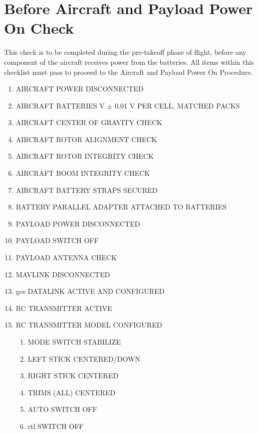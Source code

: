 \documentclass{report}
\begin{document}
	\section{Before Aircraft and Payload Power On Check}
		This check is to be completed during the pre-takeoff phase of flight, before any component of the aircraft receives power from the batteries.  All items within this checklist must pass to proceed to the Aircraft and Payload Power On Procedure.
		\begin{enumerate}
			\item AIRCRAFT POWER \hrulefill DISCONNECTED
			\item AIRCRAFT BATTERIES  V $\pm$ 0.01 V PER CELL, MATCHED PACKS
			\item AIRCRAFT CENTER OF GRAVITY \hrulefill CHECK
			\item AIRCRAFT ROTOR ALIGNMENT \hrulefill CHECK
			\item AIRCRAFT ROTOR INTEGRITY \hrulefill CHECK
			\item AIRCRAFT BOOM INTEGRITY \hrulefill CHECK
			\item AIRCRAFT BATTERY STRAPS \hrulefill SECURED
			\item BATTERY PARALLEL ADAPTER \hrulefill ATTACHED TO BATTERIES
			\item PAYLOAD POWER \hrulefill DISCONNECTED
			\item PAYLOAD SWITCH \hrulefill OFF
			\item PAYLOAD ANTENNA \hrulefill CHECK
			\item MAVLINK \hrulefill DISCONNECTED
			\item \gls{gcs} DATALINK \hrulefill ACTIVE AND CONFIGURED
			\item RC TRANSMITTER \hrulefill ACTIVE
			\item RC TRANSMITTER MODEL \hrulefill CONFIGURED
			\begin{enumerate}
				\item MODE SWITCH \hrulefill STABILIZE
				\item LEFT STICK \hrulefill CENTERED/DOWN
				\item RIGHT STICK \hrulefill CENTERED
				\item TRIMS (ALL) \hrulefill CENTERED
				\item AUTO SWITCH \hrulefill OFF
				\item \gls{rtl} SWITCH \hrulefill OFF
			\end{enumerate}
		\end{enumerate}
\end{document}
